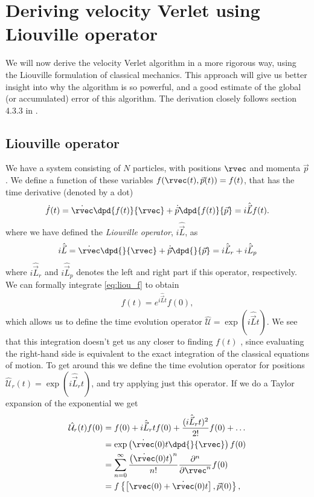 \section{Deriving velocity Verlet using Liouville operator\label{sec:liou}\label{appendix:liouville_verlet}}
\newcommand{\Liou}{i\hat{\vec L}}
\newcommand{\Lop}{\hat{\mathcal{U}}}
%
We will now derive the velocity Verlet algorithm in a more rigorous way, using the Liouville formulation of classical mechanics. This approach will give us better insight into why the algorithm is so powerful, and a good estimate of the global (or accumulated) error of this algorithm. The derivation closely follows section 4.3.3 in \cite{frenkel2001understanding}.

\subsection{Liouville operator}
We have a system consisting of $N$ particles, with positions $\rvec$ and momenta $\vec p$. We define a function of these variables $f(\rvec(t), \vec p(t)) = f(t)$, that has the time derivative %
(denoted by a dot)
\begin{align}
    \dot f(t) = \dot \rvec \dpd{f(t)}{\rvec} + \dot {\vec p} \dpd{f(t)}{\vec p} = \Liou f(t).
    \label{eq:liou_f}
\end{align}
where we have defined the \emph{Liouville operator}, $\Liou$, as
\begin{align*}
    \Liou = \dot \rvec \dpd{}{\rvec} + \dot {\vec p} \dpd{}{\vec p} = \Liou_r + \Liou_p
\end{align*}
where $\Liou_r$ and $\Liou_p$ denotes the left and right part if this operator, respectively. %
We can formally integrate \cref{eq:liou_f} to obtain
\begin{align}
    f(t) = e^{\Liou t} f(0),
    \label{eq:liou_integrate}
\end{align}
which allows us to define the time evolution operator $\Lop = \exp(\Liou t)$. We see that this integration doesn't get us any closer to finding $f(t)$%
, since evaluating the right-hand side is equivalent to the exact integration of the classical equations of motion. To get around this we define the time evolution operator for positions $\Lop_r(t) = \exp(\Liou_r t)$, and try applying just this operator. If we do a Taylor expansion of the exponential we get
\begin{align*}
    \Lop_r(t)f(0)
    &= f(0) + \Liou_r t f(0) + \frac{(\Liou_r t)^2}{2!} f(0) + \dots \\
    &= \exp\left( \dot\rvec (0) t \dpd{}{\rvec} \right) f(0) \\
    &= \sum_{n=0}^\infty \frac{ \big(\dot\rvec(0) t\big)^n}{n!} \frac{\partial^n}{\partial \rvec^n} f(0) \\
    &= f\left\{ \left[ \rvec(0) + \dot\rvec(0)t \right], \vec p(0) \right\},
\end{align*}
